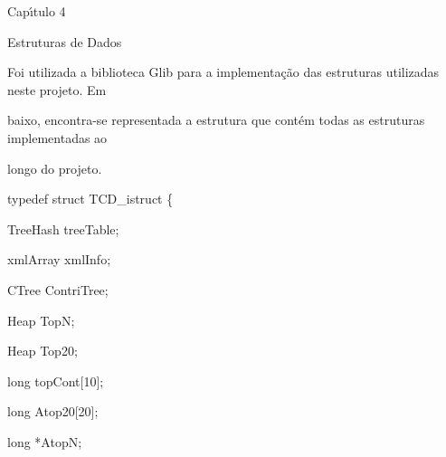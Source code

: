 \documentclass[a4paper,portrait,12pt]{article}
\begin{document}
\begin{flushleft}
\newpage
Cap\i{}́tulo 4
\end{flushleft}





\begin{flushleft}
Estruturas de Dados
\end{flushleft}


\begin{flushleft}
Foi utilizada a biblioteca Glib para a implementação das estruturas utilizadas neste projeto. Em
\end{flushleft}


\begin{flushleft}
baixo, encontra-se representada a estrutura que contém todas as estruturas implementadas ao
\end{flushleft}


\begin{flushleft}
longo do projeto.
\end{flushleft}





\begin{flushleft}
typedef struct TCD\_istruct \{
\end{flushleft}


\begin{flushleft}
TreeHash treeTable;
\end{flushleft}


\begin{flushleft}
xmlArray xmlInfo;
\end{flushleft}


\begin{flushleft}
CTree ContriTree;
\end{flushleft}


\begin{flushleft}
Heap TopN;
\end{flushleft}


\begin{flushleft}
Heap Top20;
\end{flushleft}


\begin{flushleft}
long topCont[10];
\end{flushleft}


\begin{flushleft}
long Atop20[20];
\end{flushleft}


\begin{flushleft}
long *AtopN;
\end{flushleft}
\end{document}
